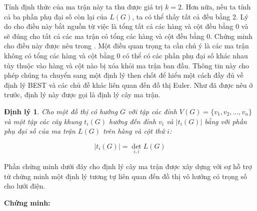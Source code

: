 \documentclass[14pt, a4paper]{article}
\numberwithin{equation}{section}
\numberwithin{figure}{section}
\newtheorem{dl}{Định lý}
\numberwithin{dl}{section}
\numberwithin{md}{section}
\numberwithin{bd}{section}
\numberwithin{dn}{section}
\numberwithin{hq}{section}
\begin{document}
    Tính định thức của ma trận này ta thu được giá trị $k=2$.
    Hơn nữa, nếu ta tính cả ba phần phụ đại số còn lại của $L(G)$, ta có thể thấy tất cả đều bằng 2.
    Lý do cho điều này bắt nguồn từ việc là tổng tất cả các hàng và cột đều bằng 0 và sẽ đúng cho tất cả các ma trận có tổng các hàng và cột đều bằng 0.
    Chứng minh cho điều này được nêu trong \cite{fleischner1990eulerian}.
    Một điều quan trọng ta cần chú ý là các ma trận không có tổng các hàng và cột bằng 0 có thể có các phần phụ đại số khác nhau tùy thuộc vào hàng và cột nào bị xóa khỏi ma trận ban đầu.
    Thông tin này cho phép chúng ta chuyển sang một định lý then chốt để hiểu một cách đầy đủ về định lý BEST và các chủ đề khác liên quan đến đồ thị Euler.
    Như đã được nêu ở trước, định lý này được gọi là định lý cây ma trận.

    \begin{dl}
        Cho một đồ thị có hướng $G$ với tập các đỉnh $V(G)=\lbrace v_1, v_2, \dots, v_n \rbrace$ và một tập các cây khung $t_i (G)$ hướng đến đỉnh $v_i$ và $\lvert t_i(G) \rvert$ bằng với phần phụ đại số của ma trận $L(G)$ trên hàng và cột thứ $i$:

        \begin{equation*}
            \lvert t_i(G) \rvert = \det_{i, i} L(G)
        \end{equation*}
    \end{dl}

    Phần chứng minh dưới đây cho định lý cây ma trận được xây dựng với sự hỗ trợ từ \cite{bollobas1998graduate} chứng minh một định lý tương tự liên quan đến đồ thị vô hướng có trọng số cho lưới điện.

    \textbf{Chứng minh:}
    

    \newpage
    \printbibliography[title={TÀI LIỆU THAM KHẢO}]
\end{document}

